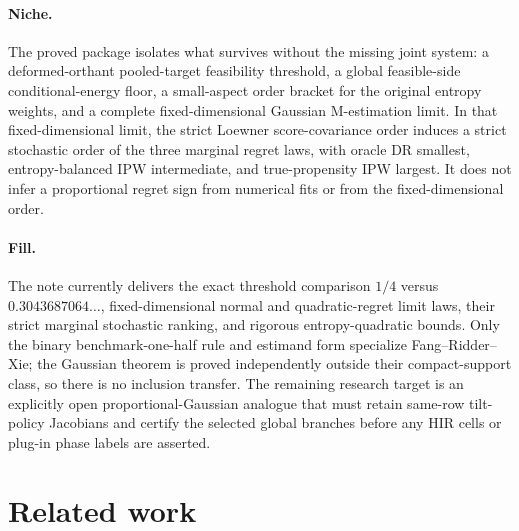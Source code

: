 \documentclass{article}
\begin{document}
\paragraph{Niche.} The proved package isolates what survives without the missing joint system: a deformed-orthant pooled-target feasibility threshold, a global feasible-side conditional-energy floor, a small-aspect order bracket for the original entropy weights, and a complete fixed-dimensional Gaussian M-estimation limit. In that fixed-dimensional limit, the strict Loewner score-covariance order induces a strict stochastic order of the three marginal regret laws, with oracle DR smallest, entropy-balanced IPW intermediate, and true-propensity IPW largest. It does not infer a proportional regret sign from numerical fits or from the fixed-dimensional order.

\paragraph{Fill.} The note currently delivers the exact threshold comparison \(1/4\) versus \(0.3043687064\ldots\), fixed-dimensional normal and quadratic-regret limit laws, their strict marginal stochastic ranking, and rigorous entropy-quadratic bounds. Only the binary benchmark-one-half rule and estimand form specialize Fang--Ridder--Xie; the Gaussian theorem is proved independently outside their compact-support class, so there is no inclusion transfer. The remaining research target is an explicitly open proportional-Gaussian analogue that must retain same-row tilt-policy Jacobians and certify the selected global branches before any HIR cells or plug-in phase labels are asserted.

\section{Related work}
\end{document}
